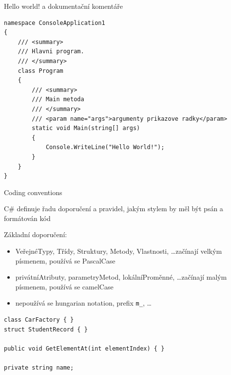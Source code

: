\begin{frame}[fragile]
\begin{exampleblock}{Hello world! a dokumentační komentáře}
\begin{lstlisting}[basicstyle=\small]
namespace ConsoleApplication1
{
    /// <summary>
    /// Hlavni program.
    /// </summary>
    class Program
    {
        /// <summary>
        /// Main metoda
        /// </summary>
        /// <param name="args">argumenty prikazove radky</param>
        static void Main(string[] args)
        {
            Console.WriteLine("Hello World!");
        }
    }
}
\end{lstlisting}
\end{exampleblock}
\end{frame}


\begin{frame}[fragile]
\vfill
\begin{bitemize}{Coding conventions}
\item C\# definuje řadu doporučení a pravidel, jakým stylem by měl být psán a formátován kód
\item Základní doporučení:
\begin{itemize}
\item \color{green!50!black}VeřejnéTypy, Třídy, Struktury, Metody, Vlastnosti, \ldots začínají velkým písmenem, používá se PascalCase
\item \color{blue}privátníAtributy, parametryMetod, lokálníProměnné, \ldots začínají malým písmenem, používá se camelCase
\item \color{red}nepoužívá se hungarian notation, prefix \lstinline|m_|, \ldots
\end{itemize}

\end{bitemize}
\vfill
\begin{yesblock}
\begin{lstlisting}
class CarFactory { }
struct StudentRecord { }

public void GetElementAt(int elementIndex) { }

private string name;
\end{lstlisting}
\end{yesblock}
\vfill
\end{frame}





